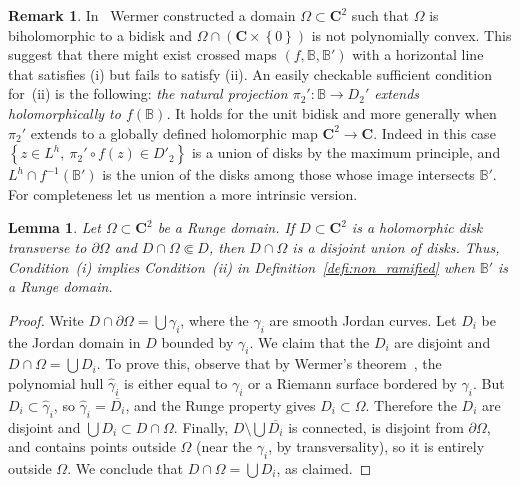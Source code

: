 \documentclass[oneside, 12pt]{amsart}
\newcommand{\fr}{\partial}
\newcommand{\set}[1]{\left\{#1\right\}}
\newcommand{\abs}[1]{\left\vert#1\right\vert}
\newcommand{\inv}{^{-1}}
\newcommand{\C}{\mathbf{C}}
\newcommand{\bb}{\mathbb{B}}
\theoremstyle{plain}
\newtheorem{lem}[thm]{Lemma}
\theoremstyle{definition}
\newtheorem{rem}[thm]{Remark}
\numberwithin{equation}{section}       %
\numberwithin{equation}{section}       %
\begin{document}
\begin{rem}\label{rem:non_ramified}
In~\cite{Wermer:1980} Wermer constructed a domain $\Omega\subset \C^2$ such that $\Omega$ is biholomorphic to a bidisk and $\Omega \cap (\C\times \set{0})$ is not polynomially convex. 
This suggest that there might exist crossed maps $(f,\bb, \bb')$
 with a horizontal line that satisfies (i) but fails to satisfy (ii).
An easily checkable sufficient  condition for~(ii) is the following: 
\emph{the natural projection $\pi_2':\bb\to D_2'$ extends holomorphically to $f(\bb)$. }
It holds for the unit bidisk and more generally 
when  $\pi_2'$ extends to a globally defined holomorphic map $\C^2\to \C$. 
 Indeed in this case $\set{z\in L^h, \  {\pi_2'\circ f(z)}\in D'_2}$ is a 
 union of disks by the maximum principle,
 and $L^h\cap f\inv(\bb')$ is the   union of the disks among those whose image intersects $\bb'$. 
 For completeness let us mention a more intrinsic version. 
\end{rem}


\begin{lem} \label{lem:runge}
Let $\Omega\subset \C^2$ be a Runge domain. If 
$D\subset \C^2$ is a  holomorphic disk   transverse to $\fr\Omega$ 
and $D\cap\Omega\Subset D$, then $D\cap \Omega$ is a disjoint union of disks.
Thus, Condition~(i) implies Condition~(ii) in Definition~\ref{defi:non_ramified} when  
  $\bb'$ is a Runge domain.
  \end{lem}

 
\begin{proof} 
Write $D\cap \fr\Omega =  \bigcup  \gamma_i$, where the $\gamma_i$ are smooth Jordan curves. 
Let  $D_i$ be the Jordan domain in $D$ bounded by $\gamma_i$.
We claim that the $D_i$ are disjoint and $D\cap \Omega = \bigcup D_i$. 
To prove this, observe that by Wermer's theorem~\cite{wermer:1958}, the polynomial hull $\widehat \gamma_i$ is either equal to $\gamma_i$ or a Riemann surface bordered by $\gamma_i$. But  $D_i\subset \widehat \gamma_i$, so $\widehat \gamma_i = \overline {D_i}$, and 
 the Runge property gives $D_i\subset \Omega$.  Therefore  the $D_i$ are disjoint and 
 $\bigcup D_i\subset D\cap \Omega$. 
 Finally, $D\setminus \bigcup \overline {D_i}$ is connected, is disjoint from $\fr \Omega$, and contains points outside $\Omega$ (near the $\gamma_i$, by transversality),  so it is entirely  outside $\Omega$. We conclude that  $D\cap \Omega = \bigcup D_i$, as claimed. 
 \end{proof}
 
\end{document}

